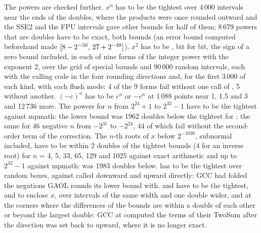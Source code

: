 \medskip
The powers are checked further. $x^n$ has to be the tightest over 4\,000
intervals near the ends of the doubles, where the products were once rounded
outward and the SSE2 and the FPU intervals gave other bounds for half of
them; 8\,679 powers that are doubles have to be exact, both bounds (an error
bound computed beforehand made 
$[8-2^{-50},\,27+2^{-48}]$). $x^2$ has to be , bit for bit,
the sign of a zero bound included, in each of nine forms of the integer power
with the exponent 2, over the grid of special bounds and 90\,000 random
intervals, each with the calling code in the four rounding directions and,
for the first 3\,000 of each kind, with each flush mode: 4 of the 9 forms
fail without one call of , 5 without another. $(-c)^n$ has to be
$c^n$ or $-c^n$ at 1\,088 points near 1, 1.5 and 3 and 12\,736 more. The
powers for $n$ from $2^{24}+1$ to $2^{32}-1$ have to be the tightest against
mpmath: the lower bound was 1962 doubles below the tightest for
; the same for 46 negative $n$ from
$-2^{31}$ to $-2^{24}$, 44 of which fail without the second-order term of
the correction. The $n$-th roots of $x$ below $2^{-1020}$, subnormal
included, have to be within 2 doubles of the tightest bounds (4 for an
inverse root) for $n$ = 4, 5, 33, 65, 129 and 1025 against exact arithmetic
and up to $2^{32}-1$ against mpmath: 
was 1983 doubles below.  has to be the tightest over
random boxes, against  called downward and upward directly:
GCC had folded the negations GAOL rounds its lower bound with.
 and  have to be the tightest, and
 to enclose $x$, over intervals of the same
width and one double wider, and at the corners where the differences of the
bounds are within a double of each other or beyond the largest double: GCC at
 computed the terms of their TwoSum after the direction was set
back to upward, where it is no longer exact.\newinvfive

